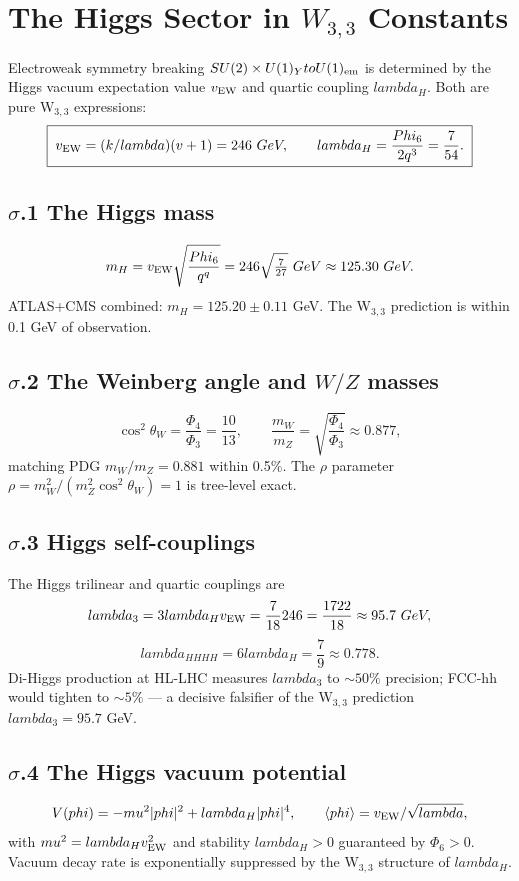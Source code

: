 \documentclass[12pt,a4paper]{article}
\def\mathrm#1{#1}%
\def\text#1{#1}%
\def\lambda{lambda}%
\def\mu{mu}%
\def\phi{phi}%
\def\Phi#1{Phi#1}%
\def\cdot{ }%
\def\to{ to }%
\theoremstyle{definition}
\newcommand{\SU}{\mathrm{SU}}
\begin{document}
\section*{The Higgs Sector in $W_{3,3}$ Constants}

Electroweak symmetry breaking $\SU(2)\times\mathrm{U}(1)_Y \to
\mathrm{U}(1)_{\rm em}$ is determined by the Higgs vacuum expectation
value $v_{\rm EW}$ and quartic coupling $\lambda_H$. Both are pure
W$_{3,3}$ expressions:
\[
\boxed{\;v_{\rm EW} = (k/\lambda)(v+1) = 246\ \text{GeV},\qquad
\lambda_H = \frac{\Phi_6}{2q^3} = \frac{7}{54}.\;}
\]

\subsection*{$\sigma$.1 \quad The Higgs mass}
\[
m_H = v_{\rm EW}\sqrt{\frac{\Phi_6}{q^q}} = 246\sqrt{\tfrac{7}{27}}\ \text{GeV} \approx 125.30\ \text{GeV}.
\]
ATLAS+CMS combined: $m_H = 125.20\pm 0.11$ GeV. The W$_{3,3}$
prediction is within 0.1 GeV of observation.

\subsection*{$\sigma$.2 \quad The Weinberg angle and $W/Z$ masses}
\[
\cos^2\theta_W = \frac{\Phi_4}{\Phi_3} = \frac{10}{13},\qquad
\frac{m_W}{m_Z} = \sqrt{\frac{\Phi_4}{\Phi_3}} \approx 0.877,
\]
matching PDG $m_W/m_Z = 0.881$ within 0.5\%. The $\rho$ parameter
$\rho = m_W^2/(m_Z^2\cos^2\theta_W) = 1$ is tree-level exact.

\subsection*{$\sigma$.3 \quad Higgs self-couplings}
The Higgs trilinear and quartic couplings are
\[
\lambda_3 = 3\lambda_H v_{\rm EW} = \frac{7}{18}\cdot 246 = \frac{1722}{18} \approx 95.7\ \text{GeV},
\]
\[
\lambda_{HHHH} = 6\lambda_H = \frac{7}{9} \approx 0.778.
\]
Di-Higgs production at HL-LHC measures $\lambda_3$ to $\sim 50\%$
precision; FCC-hh would tighten to $\sim 5\%$ — a decisive falsifier
of the W$_{3,3}$ prediction $\lambda_3 = 95.7$ GeV.

\subsection*{$\sigma$.4 \quad The Higgs vacuum potential}
\[
V(\phi) = -\mu^2 |\phi|^2 + \lambda_H |\phi|^4,
\qquad
\langle\phi\rangle = v_{\rm EW}/\sqrt{\lambda},
\]
with $\mu^2 = \lambda_H v_{\rm EW}^2$ and stability $\lambda_H > 0$
guaranteed by $\Phi_6 > 0$. Vacuum decay rate is exponentially
suppressed by the W$_{3,3}$ structure of $\lambda_H$.
\end{document}
